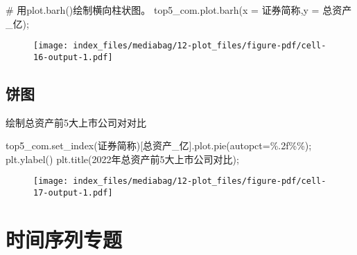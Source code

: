 \documentclass[
  letterpaper,
  DIV=11,
  numbers=noendperiod]{scrreprt}
\newenvironment{Shaded}{\begin{snugshade}}{\end{snugshade}}
\newcommand{\CommentTok}[1]{\textcolor[rgb]{0.37,0.37,0.37}{#1}}
\newcommand{\NormalTok}[1]{\textcolor[rgb]{0.00,0.23,0.31}{#1}}
\newcommand{\OperatorTok}[1]{\textcolor[rgb]{0.37,0.37,0.37}{#1}}
\newcommand{\SpecialCharTok}[1]{\textcolor[rgb]{0.37,0.37,0.37}{#1}}
\newcommand{\StringTok}[1]{\textcolor[rgb]{0.13,0.47,0.30}{#1}}
\begin{document}
\begin{Shaded}
\begin{Highlighting}[]
\CommentTok{\# 用plot.barh()绘制横向柱状图。}
\NormalTok{top5\_com.plot.barh(x }\OperatorTok{=} \StringTok{\textquotesingle{}证券简称\textquotesingle{}}\NormalTok{,y }\OperatorTok{=} \StringTok{\textquotesingle{}总资产\_亿\textquotesingle{}}\NormalTok{)}\OperatorTok{;}
\end{Highlighting}
\end{Shaded}

\begin{figure}[H]

{\centering \texttt{[image: index\_files/mediabag/12-plot\_files/figure-pdf/cell-16-output-1.pdf]}

}

\end{figure}

\hypertarget{ux997cux56fe}{%
\subsection{饼图}\label{ux997cux56fe}}

绘制总资产前5大上市公司对对比

\begin{Shaded}
\begin{Highlighting}[]
\NormalTok{top5\_com.set\_index(}\StringTok{\textquotesingle{}证券简称\textquotesingle{}}\NormalTok{)[}\StringTok{\textquotesingle{}总资产\_亿\textquotesingle{}}\NormalTok{].plot.pie(autopct}\OperatorTok{=}\StringTok{\textquotesingle{}}\SpecialCharTok{\%.2f\%\%}\StringTok{\textquotesingle{}}\NormalTok{)}\OperatorTok{;}
\NormalTok{plt.ylabel(}\StringTok{\textquotesingle{}\textquotesingle{}}\NormalTok{)}
\NormalTok{plt.title(}\StringTok{\textquotesingle{}2022年总资产前5大上市公司对比\textquotesingle{}}\NormalTok{)}\OperatorTok{;}
\end{Highlighting}
\end{Shaded}

\begin{figure}[H]

{\centering \texttt{[image: index\_files/mediabag/12-plot\_files/figure-pdf/cell-17-output-1.pdf]}

}

\end{figure}

\hypertarget{ux65f6ux95f4ux5e8fux5217ux4e13ux9898}{%
\section{时间序列专题}\label{ux65f6ux95f4ux5e8fux5217ux4e13ux9898}}
\end{document}
